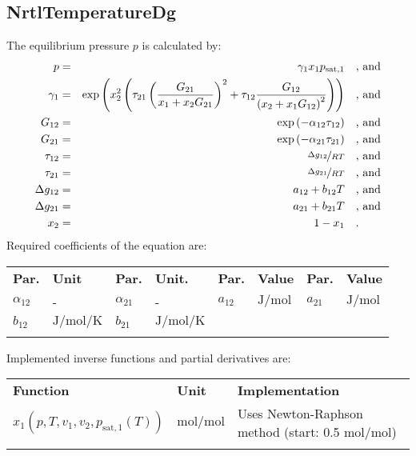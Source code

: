 \subsection{NrtlTemperatureDg}
\label{cha:approaches:abs:act:nrtl_tdg}
%
The equilibrium pressure $p$ is calculated by:
%
\begin{equation*}
	\begin{split}
		p &=& \gamma_1 x_1 p_\mathrm{sat,1} & \quad\text{, and} \\
		\gamma_1 &=& \exp \left( x_2^2 \left( \tau_{21} \left( \frac{G_{21}}{x_1 + x_2 G_{21}} \right) ^2 + \tau_{12} \frac{G_{12}}{\left( x_2 + x_1 G_{12} \right) ^2}\right) \right) & \quad\text{, and} \\
		G_{12} &=& \exp \left( -\alpha_{12} \tau_{12} \right) & \quad\text{, and} \\
		G_{21} &=& \exp \left( -\alpha_{21} \tau_{21} \right) & \quad\text{, and} \\
		\tau_{12} &=& \nicefrac{\Delta g_{12}}{R T} & \quad\text{, and} \\
		\tau_{21} &=& \nicefrac{\Delta g_{21}}{R T} & \quad\text{, and} \\
		\Delta g_{12} &=& a_{12} + b_{12} T & \quad\text{, and} \\
		\Delta g_{21} &=& a_{21} + b_{21} T & \quad\text{, and} \\
		x_2 &=& 1 - x_1  & \quad\text{.} \\
	\end{split}
\end{equation*}
%
Required coefficients of the equation are:
%
\begin{longtable}[l]{ll|ll|ll|ll}
\toprule
\addlinespace
\textbf{Par.} & \textbf{Unit} & \textbf{Par.} &	\textbf{Unit.} & \textbf{Par.} & \textbf{Value} & \textbf{Par.} & \textbf{Value} \\
\addlinespace
\midrule
\endhead

\bottomrule
\endfoot
\bottomrule
\endlastfoot
\addlinespace

$\alpha_{12}$ & - & $\alpha_{21}$ & - & $a_{12}$ & $\si{\joule\per\mole}$ & $a_{21}$ & $\si{\joule\per\mole}$ \\
$b_{12}$ & $\si{\joule\per\mole\per\kelvin}$ & $b_{21}$ & $\si{\joule\per\mole\per\kelvin}$ & & & &  \\

\addlinespace
\end{longtable}
%
Implemented inverse functions and partial derivatives are:
%
\begin{longtable}[l]{l|l|p{7.5cm}}
	\toprule
	\addlinespace
	\textbf{Function} & \textbf{Unit} &	\textbf{Implementation} \\
	\addlinespace
	\midrule
	\endhead
	
	\bottomrule
	\endfoot
	\bottomrule
	\endlastfoot
	\addlinespace
	
	$x_1(p,T,v_1,v_2,p_\mathrm{sat,1}(T))$& $\si{\mole\per\mole}$ & Uses Newton-Raphson method (start: 0.5 $\si{\mole\per\mole}$) \\
	
	\addlinespace
\end{longtable}
